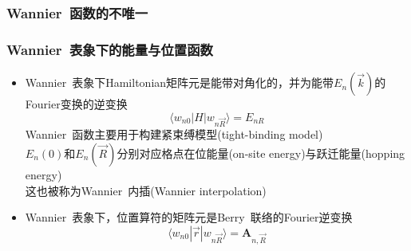 \frame
{
	\frametitle{\textrm{Wannier~}函数的不唯一}
\begin{figure}[h!]
\centering
\hspace*{-0.35in}
\label{Non-local Wannier-function}
\end{figure}
}

\frame
{
	\frametitle{\textrm{Wannier~}表象下的能量与位置函数}
	\begin{itemize}
		\item \textrm{Wannier~}表象下\textrm{Hamiltonian}矩阵元是能带对角化的，并为能带$E_n(\vec k)$的\textrm{Fourier}变换的逆变换
			\begin{displaymath}
				\langle w_{n0}|H|w_{n\vec R}\rangle=E_{nR}
			\end{displaymath}
			\textrm{Wannier~}函数主要用于构建紧束缚模型\textrm{(tight-binding model)}\\
			$E_n(0)$和$E_n(\vec R)$分别对应格点在位能量\textrm{(on-site energy)}与跃迁能量\textrm{(hopping energy)}\\
			这也被称为\textrm{Wannier~}内插\textrm{(Wannier interpolation)}
		\item \textrm{Wannier~}表象下，位置算符的矩阵元是\textrm{Berry~}联络的\textrm{Fourier}逆变换
			\begin{displaymath}
				\langle w_{n0}|\vec r|w_{n\vec R}\rangle=\mathbf{A}_{n,\vec R}
			\end{displaymath}
	\end{itemize}
}

